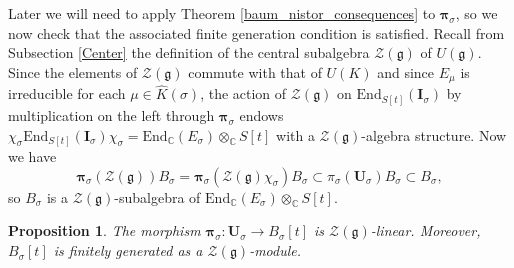 \documentclass{amsart}
\newtheorem{proposition}[theorem]{Proposition}
\theoremstyle{definition}
\begin{document}
Later we will need to apply Theorem \ref{baum_nistor_consequences} to $\bm{\pi}_\sigma$, so we now check that the associated finite generation condition is satisfied. Recall from Subsection \ref{Center} the definition of the central subalgebra $\mathcal{Z}(\bm{\mathfrak{g}})$ of $U(\bm{\mathfrak{g}})$. Since the elements of $\mathcal{Z}(\bm{\mathfrak{g}})$ commute with that of $U(K)$ and since $E_\mu$ is irreducible for each $\mu \in \widehat{K}(\sigma)$, the action of $\mathcal{Z}(\bm{\mathfrak{g}})$ on $\mathrm{End}_{S[t]}(\bm{I}_\sigma)$ by multiplication on the left through $\bm{\pi}_\sigma$ endows $\chi_\sigma\mathrm{End}_{S[t]}(\bm{I}_\sigma) \chi_\sigma= \mathrm{End}_\mathbb{C}(E_\sigma) \otimes_\mathbb{C} S[t]$ with a $\mathcal{Z}(\bm{\mathfrak{g}})$-algebra structure. Now we have
\[\bm{\pi}_\sigma(\mathcal{Z}(\bm{\mathfrak{g}})) B_\sigma = \bm{\pi}_\sigma(\mathcal{Z}(\bm{\mathfrak{g}})\chi_\sigma)B_\sigma \subset \pi_\sigma(\bm{U}_\sigma)B_\sigma \subset B_\sigma,\]
so $B_\sigma$ is a $\mathcal{Z}(\bm{\mathfrak{g}})$-subalgebra of $\mathrm{End}_\mathbb{C}(E_\sigma) \otimes_\mathbb{C} S[t]$.

\begin{proposition}\label{Z(g)_linear}
    The morphism $\bm{\pi}_\sigma : \bm{U}_\sigma \to B_\sigma[t]$ is $\mathcal{Z}(\bm{\mathfrak{g}})$-linear. Moreover, $B_\sigma[t]$ is finitely generated as a $\mathcal{Z}(\bm{\mathfrak{g}})$-module.
\end{proposition}
\end{document}
